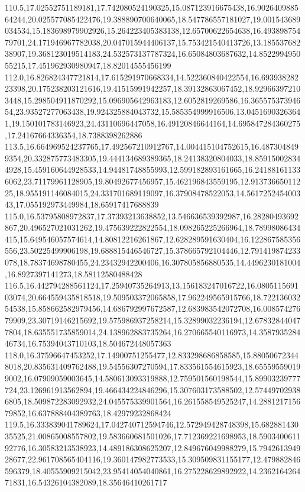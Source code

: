 \documentclass[handout,10pt,t,aspectratio=169]{beamer}
\begin{document}
{110.5,17.02552751189181,17.742080524190325,15.087123916675438,16.902640988564244,20.025577085422476,19.388890700640065,18.547786557181027,19.001543689034534,15.183698979902926,15.264223405383138,12.65700622654638,16.49389875479701,24.171946967782038,20.047015944406137,15.753421540413726,13.18553768238907,19.368123019514183,24.532573137787324,16.65084803687632,14.852299495055215,17.451962930980947,18.82014555456199
112.0,16.826824347721814,17.615291970668334,14.522360840422554,16.69393828223398,20.175238203121616,19.41515991942257,18.39132863067452,18.929663972103448,15.298504911870292,15.096905642963183,12.6052819269586,16.36557537394654,23.93527277063438,19.924325884043732,15.585354999916506,13.04516903263641,19.150101783146923,24.43110696447058,16.49120846644164,14.695847284360275,17.24167664336354,18.7388398262886
113.5,16.664969524237765,17.492567210912767,14.004415104752615,16.4873048499354,20.332875773483305,19.444134689389365,18.24138320804033,18.859150028344928,15.459160644928533,14.94481748855993,12.599182893161665,16.241881611336062,23.71179961128905,19.80492677456957,15.462196843559195,12.91373665011225,18.955191146084015,24.331701689119097,16.37908478522053,14.561725245400343,17.055192973449984,18.65917417688839
115.0,16.53795808972837,17.37393213638852,13.546636539392987,16.28280493692867,20.496527021031262,19.475639222822554,18.098265225266964,18.78998086434415,15.649546057574614,14.80812216261867,12.628289591630404,16.122867585356556,23.50225499906198,19.688815446546727,15.378665792104446,12.791419874233078,18.78374698780455,24.23432942200406,16.307805856880535,14.4496230181004,16.8927397141273,18.58112580488428
116.5,16.442794288561124,17.25940735264913,13.156183247016722,16.080511569103074,20.664559435818518,19.509503372065858,17.962249565915766,18.72213603254538,15.858662582979456,14.686792997672587,12.683983542072708,16.00857427679909,23.30719146215692,19.575986937258214,15.32899032236194,12.678328440477804,18.635551735859014,24.138962883735264,16.270665540116973,14.358793528446734,16.75394043710103,18.504672448057363
118.0,16.37596647453252,17.14900751255477,12.833298686858585,15.880506723448018,20.835631409762488,19.54556307270594,17.833561554615923,18.655595590199002,16.07909059003645,14.580613093319888,12.759501560198544,15.89903239777724,23.126961913562894,19.466434224846296,15.307603173588502,12.574497029386805,18.509872283092932,24.045575339901564,16.261558549525247,14.288121715679852,16.637888404389763,18.42979232868424
119.5,16.333839041789624,17.042740712594746,12.572949428748398,15.68288143035525,21.00865008557802,19.583660681501026,17.712369221698953,18.590340061192776,16.30583213538923,14.489186308625207,12.849676049988279,15.794261394928677,22.961708565404116,19.360147982773533,15.309509831155177,12.479882846596379,18.40555909215042,23.95414054040861,16.275228629892922,14.236216426471831,16.54326104382089,18.35646410261717
}
\end{document}
